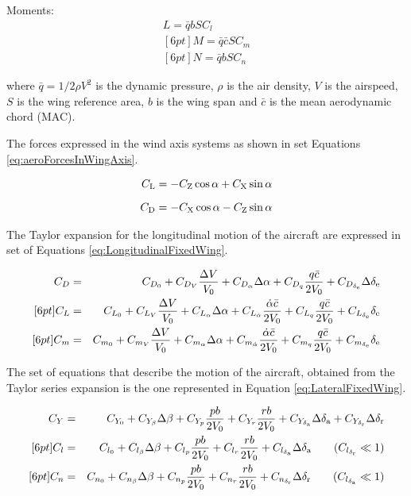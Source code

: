   \noindent
  Moments:
  \begin{eqnarray}
  L = \bar{q} b S C_l \\ [6pt]
  M = \bar{q} \bar{c} S C_m \\ [6pt]
  N = \bar{q} b S C_n
  \end{eqnarray}

  \noindent
  where $\bar{q}=1/2 \rho V^2$ is the dynamic pressure, $\rho$ is the air density, $V$ is the airspeed, $S$ is the wing reference area, $b$ is the wing span and $\bar{c}$ is the mean aerodynamic chord (MAC). 

  The forces expressed in the wind axis systems as shown in set Equations \ref{eq:aeroForcesInWingAxis}. 

  \begin{eqnarray} \label{eq:aeroForcesInWingAxis}
  C_{\mathrm{L}} = - C_{\mathrm{Z}} \cos \alpha + C_{\mathrm{X}} \sin \alpha \nonumber \\[6pt]
  C_{\mathrm{D}} = - C_{\mathrm{X}} \cos \alpha - C_{\mathrm{Z}} \sin \alpha
  \end{eqnarray}

  The Taylor expansion for the longitudinal motion of the aircraft are expressed in set of Equations \ref{eq:LongitudinalFixedWing}.

  \begin{eqnarray} \label{eq:LongitudinalFixedWing}
  C_D &=& C_{D_0} + C_{D_V} \frac{\Delta V}{V_0} + C_{D_\alpha} \Delta \alpha + C_{D_q} \frac{q \bar{c}}{2 V_0} + C_{D_{\delta_{\mathrm{e}}} }\Delta \delta_{\mathrm{e}} \nonumber \\ [6pt]
  C_L &=& C_{L_0} + C_{L_V} \frac{\Delta V}{V_0} + C_{L_\alpha} \Delta \alpha + C_{L_{\dot{\alpha}}} \frac{\dot{\alpha} \bar{c} }{2 V_0} + C_{L_q} \frac{q \bar{c}}{2 V_0} + C_{L_{\delta_{\mathrm{e}}}} \delta_{\mathrm{e}} \nonumber \\ [6pt]
  C_m &=& C_{m_0} + C_{m_V} \frac{\Delta V}{V_0} + C_{m_\alpha} \Delta \alpha + C_{m_{\dot{\alpha}}} \frac{\dot{\alpha} \bar{c} }{2 V_0} + C_{m_q} \frac{q \bar{c}}{2 V_0} + C_{m_{\delta_{\mathrm{e}}}} \delta_{\mathrm{e}} 
  \end{eqnarray}

  The set of equations that describe the motion of the aircraft, obtained from the Taylor series expansion is the one represented in Equation \ref{eq:LateralFixedWing}.

  \begin{eqnarray} \label{eq:LateralFixedWing}
  C_Y &=& C_{Y_0} + C_{Y_\beta}\Delta\beta + C_{Y_p}\frac{pb}{2V_0} + C_{Y_r}\frac{rb}{2V_0} + C_{Y_{\delta_{\mathrm{a}}} }\Delta \delta_{\mathrm{a}} + C_{Y_{\delta_{\mathrm{r}}} }\Delta \delta_{\mathrm{r}} \nonumber \\ [6pt]
  C_l &=& C_{l_0} + C_{l_\beta}\Delta\beta + C_{l_p}\frac{pb}{2V_0} + C_{l_r}\frac{rb}{2V_0} + C_{l_{\delta_{\mathrm{a}}} }\Delta \delta_{\mathrm{a}} \qquad (C_{l_{\delta_{\mathrm{r}}}} \ll 1) \nonumber \\ [6pt]
  C_n &=& C_{n_0} + C_{n_\beta}\Delta\beta + C_{n_p}\frac{pb}{2V_0} + C_{n_r}\frac{rb}{2V_0} + C_{n_{\delta_{\mathrm{r}}} }\Delta \delta_{\mathrm{r}} \qquad (C_{l_{\delta_{\mathrm{a}}}} \ll 1)
  \end{eqnarray}

